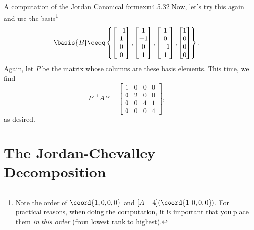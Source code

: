\begin{exm}{A computation of the Jordan Canonical form}{exm4.5.32}
	Now, let's try this again and use the basis\footnote{Note the order of $\coord{1,0,0,0}$ and $[A-4](\coord{1,0,0,0})$.  For practical reasons, when doing the computation, it is important that you place them \emph{in this order} (from lowest rank to highest).}
	\begin{equation}
		\basis{B}\ceqq \left\{ \begin{bmatrix}-1 \\ 1 \\ 0 \\ 0\end{bmatrix},\begin{bmatrix}1 \\ -1 \\ 0 \\ 1\end{bmatrix},\begin{bmatrix}1 \\ 0 \\ -1 \\ 1\end{bmatrix},\begin{bmatrix}1 \\ 0 \\ 0 \\ 0\end{bmatrix}\right\} .
	\end{equation}
	Again, let $P$ be the matrix whose columns are these basis elements.  This time, we find
	\begin{equation}
		P^{-1}AP=\begin{bmatrix}1 & 0 & 0 & 0 \\ 0 & 2 & 0 & 0 \\ 0 & 0 & 4 & 1 \\ 0 & 0 & 0 & 4\end{bmatrix},
	\end{equation}
	as desired.
\end{exm}

\section{The Jordan-Chevalley Decomposition}

